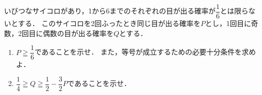 \documentclass[../../main.tex]{subfiles}
\begin{document}
いびつなサイコロがあり，1から6までのそれぞれの目が出る確率が$\displaystyle\dfrac{1}{6}$とは限らないとする．
このサイコロを2回ふったとき同じ目が出る確率を$P$とし，1回目に奇数，2回目に偶数の目が出る確率を$Q$とする．
\begin{enumerate}
  \item $\displaystyle P \geqq \dfrac{1}{6}$であることを示せ．
    また，等号が成立するための必要十分条件を求めよ．
  \item $\displaystyle \dfrac{1}{4} \geqq Q \geqq \dfrac{1}{2} - \dfrac{3}{2}P $であることを示せ．
\end{enumerate}
\end{document}

